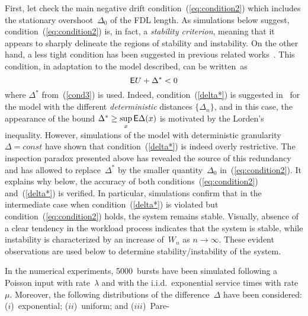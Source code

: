 \begin{multicols}{2}
First, let
check the main negative drift condition~(\ref{eq:condition2})
which includes the stationary overshoot~$\Delta_0$ of the FDL
length. As simulations below suggest, condition~(\ref{eq:condition2}) is, in
fact, a {\it stability criterion}, meaning that it appears to sharply delineate
the regions of stability and instability. On the other hand,  a less tight
condition has been suggested in previous related works~\cite{optical1, optical2}. 
This condition, in adaptation to the
model described, can be written~as
\begin{equation}
\label{delta*} {\sf E} U + \Delta^* < 0
\end{equation}
where $\Delta^*$  from~(\ref{cond3}) is used. Indeed, condition~(\ref{delta*}) 
is suggested  in~\cite{optical1, optical2} for   the model  with the different 
{\it deterministic} distances $\{\Delta_n\}$, and in this case, the appearance 
of the bound $\Delta^*\ge \sup\limits_x {\sf E} \Delta(x)$ is motivated by   the 
Lorden's inequality.  However, simulations of the model with  deterministic 
granularity $\Delta=const$  have  shown that
 condition~(\ref{delta*}) is indeed 
overly restrictive. The inspection paradox presented above has revealed the 
source of this redundancy and has allowed to replace~$\Delta^*$  by the smaller 
quantity~$\Delta_0$ in~(\ref{eq:condition2}).
 It explains  why below, the 
accuracy of both conditions~(\ref{eq:condition2}) and~(\ref{delta*}) is verified.
 In particular, 
simulations confirm that in the intermediate case when condition~(\ref{delta*}) 
is  violated but condition~(\ref{eq:condition2}) holds, the system remains stable.
Visually, absence of a clear tendency in the workload process indicates
that the system is stable, while instability is characterized by an 
increase of~$W_n$ as $n\to 
\infty$.  These evident observations are used  below to determine 
stability/instability of the system.

 In the numerical experiments,
 5000~bursts  have been simulated following a Poisson input with
 rate~$\lambda$ and with   the i.i.d.\ exponential service times  with
 rate~$\mu$.  Moreover, the following distributions of
 the  difference~$\Delta$ have been  considered: ($i$)~exponential; ($ii$)~uniform; 
 and ($iii$)~Pare-\linebreak\vspace*{-12pt}

\begin{center}  %
\vspace*{-3pt}
\mbox{%
 \epsfxsize=80mm
 }
  \end{center}
  

\end{multicols}
